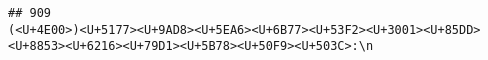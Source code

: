 \documentclass[
]{article}
\begin{document}
\begin{verbatim}
## 909                                                                                                                                                                                                                                                                                                                                                                                                                                                                                                                                                                                                                                                                                                                                                                                                                                                                                                                                                                                                                                                                                                                                                                                                                                                                                                                                                                                     (<U+4E00>)<U+5177><U+9AD8><U+5EA6><U+6B77><U+53F2><U+3001><U+85DD><U+8853><U+6216><U+79D1><U+5B78><U+50F9><U+503C>:\n 
\end{verbatim}
\end{document}
